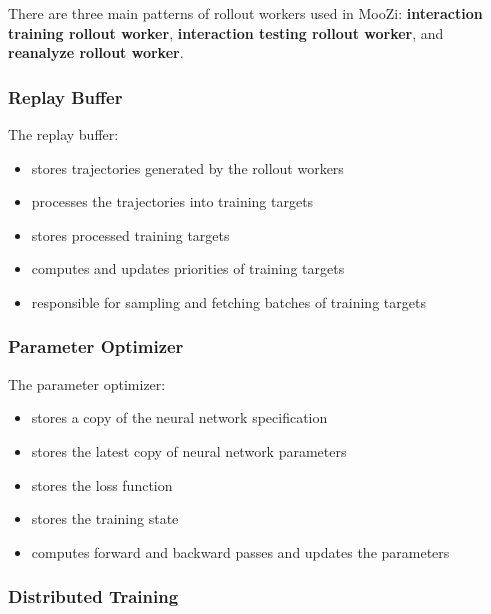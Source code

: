 \documentclass[12pt]{article}
\begin{document}
There are three main patterns of rollout workers used in MooZi:
\textbf{interaction training rollout worker},
\textbf{interaction testing rollout worker},
and \textbf{reanalyze rollout worker}.

\subsubsection{Replay Buffer}
The replay buffer:
\begin{itemize}
    \item stores trajectories generated by the rollout workers
    \item processes the trajectories into training targets
    \item stores processed training targets
    \item computes and updates priorities of training targets
    \item responsible for sampling and fetching batches of training targets
\end{itemize}

\subsubsection{Parameter Optimizer}
The parameter optimizer:
\begin{itemize}
    \item stores a copy of the neural network specification
    \item stores the latest copy of neural network parameters
    \item stores the loss function
    \item stores the training state
    \item computes forward and backward passes and updates the parameters
\end{itemize}

\subsubsection{Distributed Training}
\end{document}
